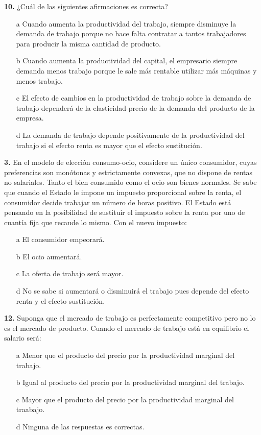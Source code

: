 \documentclass{nuevotema}
\begin{document}
\preguntas




\textbf{10.} ¿Cuál de las siguientes afirmaciones es correcta?

\begin{itemize}
	\item[a] Cuando aumenta la productividad del trabajo, siempre disminuye la demanda de trabajo porque no hace falta contratar a tantos trabajadores para producir la misma cantidad de producto.
	\item[b] Cuando aumenta la productividad del capital, el empresario siempre demanda menos trabajo porque le sale más rentable utilizar más máquinas y menos trabajo.
	\item[c] El efecto de cambios en la productividad de trabajo sobre la demanda de trabajo dependerá de la elasticidad-precio de la demanda del producto de la empresa.
	\item[d] La demanda de trabajo depende positivamente de la productividad del trabajo si el efecto renta es mayor que el efecto sustitución.
\end{itemize}


\textbf{3.} En el modelo de elección consumo-ocio, considere un único consumidor, cuyas preferencias son monótonas y estrictamente convexas, que no dispone de rentas no salariales. Tanto el bien consumido como el ocio son bienes normales. Se sabe que cuando el Estado le impone un impuesto proporcional sobre la renta, el consumidor decide trabajar un número de horas positivo. El Estado está pensando en la posibilidad de sustituir el impuesto sobre la renta por uno de cuantía fija que recaude lo mismo. Con el nuevo impuesto:

\begin{enumerate}
	\item[a] El consumidor empeorará.
	\item[b] El ocio aumentará.
	\item[c] La oferta de trabajo será mayor.
	\item[d] No se sabe si aumentará o disminuirá el trabajo pues depende del efecto renta y el efecto sustitución.
\end{enumerate}


\textbf{12.} Suponga que el mercado de trabajo es perfectamente competitivo pero no lo es el mercado de producto. Cuando el mercado de trabajo está en equilibrio el salario será:
\begin{enumerate}
	\item[a] Menor que el producto del precio por la productividad marginal del trabajo.
	\item[b] Igual al producto del precio por la productividad marginal del trabajo.
	\item[c] Mayor que el producto del precio por la productividad marginal del traabajo.
	\item[d] Ninguna de las respuestas es correctas.
\end{enumerate}
\end{document}
